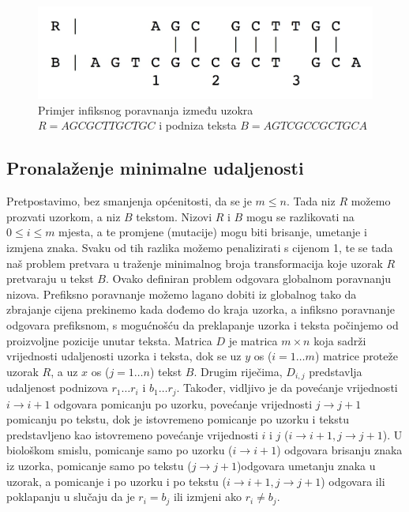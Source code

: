 \documentclass[times, utf8, zavrsni]{fer}
\begin{document}
\begin{figure}[ht!]
\centering
\includegraphics[width=120mm]{infix_example.jpeg}
\caption{Primjer infiksnog poravnanja između uzokra $R = AGCGCTTGCTGC$ i podniza teksta $B = AGTCGCCGCTGCA $}\label{fig:infixExample1}
\end{figure}

\subsection{Pronalaženje minimalne udaljenosti}
\label{subsec:osnovniAlgoritam}
Pretpostavimo, bez smanjenja općenitosti, da se je $m{\leq}n$. Tada niz $R$ možemo prozvati uzorkom, a niz $B$ tekstom. Nizovi $R$ i $B$ mogu se razlikovati na $0{\leq}i{\leq}m$ mjesta, a te promjene (mutacije) mogu biti brisanje, umetanje i izmjena znaka. Svaku od tih razlika možemo penalizirati s cijenom 1, te se tada naš problem pretvara u traženje minimalnog broja transformacija koje uzorak $R$ pretvaraju u tekst $B$. Ovako definiran problem odgovara globalnom poravnanju nizova. Prefiksno poravnanje možemo lagano dobiti iz globalnog tako da zbrajanje cijena prekinemo kada dođemo do kraja uzorka, a infiksno poravnanje odgovara prefiksnom, s mogućnošću da preklapanje uzorka i teksta počinjemo od proizvoljne pozicije unutar teksta.
Matrica $D$ je matrica $m{\times}n$ koja sadrži vrijednosti udaljenosti uzorka i teksta, dok se uz $y$ os ($i=1{\dots}m$) matrice proteže uzorak $R$, a uz $x$ os ($j=1{\dots}n$) tekst $B$. Drugim riječima, $D_{i,j}$ predstavlja udaljenost podnizova $r_{1}{\dots}r_{i}$ i $b_{1}{\dots}r_{j}$. Također, vidljivo je da povećanje vrijednosti $i{\rightarrow}i+1$ odgovara pomicanju po uzorku, povećanje vrijednosti $j{\rightarrow}j+1$ pomicanju po tekstu, dok je istovremeno pomicanje po uzorku i tekstu predstavljeno kao istovremeno povećanje vrijednosti $i$ i $j$ ($i{\rightarrow}i+1, j{\rightarrow}j+1$). U biološkom smislu, pomicanje samo po uzorku ($i{\rightarrow}i+1$) odgovara brisanju znaka iz uzorka, pomicanje samo po tekstu ($j{\rightarrow}j+1$)odgovara umetanju znaka u uzorak, a pomicanje i po uzorku i po tekstu ($i{\rightarrow}i+1, j{\rightarrow}j+1$) odgovara ili poklapanju u slučaju da je $r_{i}=b_{j}$ ili izmjeni ako $r_{i} \neq b_{j}$.
\end{document}
